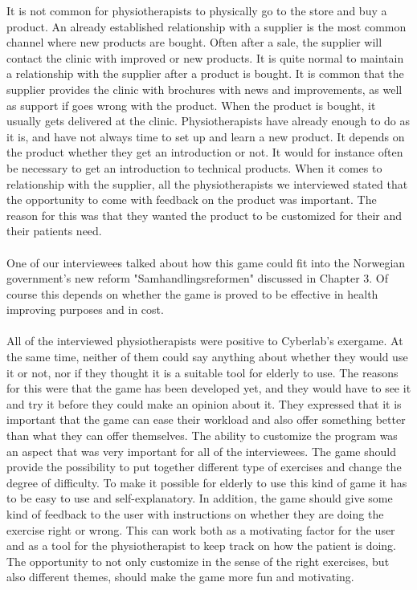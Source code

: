 It is not common for physiotherapists to physically go to the store and buy a product. An already established relationship with a supplier is the most common channel where new products are bought. Often after a sale, the supplier will contact the clinic with improved or new products. It is quite normal to maintain a relationship with the supplier after a product is bought. It is common that the supplier provides the clinic with brochures with news and improvements, as well as support if goes wrong with the product. When the product is bought, it usually gets delivered at the clinic. Physiotherapists have already enough to do as it is, and have not always time to set up and learn a new product. It depends on the product whether they get an introduction or not. It would for instance often be necessary to get an introduction to technical products. When it comes to relationship with the supplier, all the physiotherapists we interviewed stated that the opportunity to come with feedback on the product was important. The reason for this was that they wanted the product to be customized for their and their patients need. \\ \\
One of our interviewees talked about how this game could fit into the Norwegian government’s new reform "Samhandlingsreformen" discussed in Chapter 3. Of course this depends on whether the game is proved to be effective in health improving purposes and in cost.  \\ \\
All of the interviewed physiotherapists were positive to Cyberlab’s exergame. At the same time, neither of them could say anything about whether they would use it or not, nor if they thought it is a suitable tool for elderly to use. The reasons for this were that the game has been developed yet, and they would have to see it and try it before they could make an opinion about it. They expressed that it is important that the game can ease their workload and also offer something better than what they can offer themselves. The ability to customize the program was an aspect that was very important for all of the interviewees. The game should provide the possibility to put together different type of exercises and change the degree of difficulty. To make it possible for elderly to use this kind of game it has to be easy to use and self-explanatory. In addition, the game should give some kind of feedback to the user with instructions on whether they are doing the exercise right or wrong. This can work both as a motivating factor for the user and as a tool for the physiotherapist to keep track on how the patient is doing. The opportunity to not only customize in the sense of the right exercises, but also different themes, should make the game more fun and motivating. \\ \\
